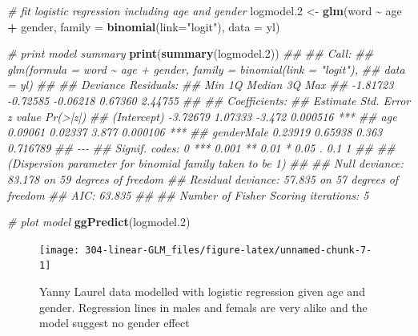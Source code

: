 \documentclass[
]{book}
\newenvironment{Shaded}{\begin{snugshade}}{\end{snugshade}}
\newcommand{\CommentTok}[1]{\textcolor[rgb]{0.56,0.35,0.01}{\textit{#1}}}
\newcommand{\DataTypeTok}[1]{\textcolor[rgb]{0.13,0.29,0.53}{#1}}
\newcommand{\FloatTok}[1]{\textcolor[rgb]{0.00,0.00,0.81}{#1}}
\newcommand{\KeywordTok}[1]{\textcolor[rgb]{0.13,0.29,0.53}{\textbf{#1}}}
\newcommand{\NormalTok}[1]{#1}
\newcommand{\OperatorTok}[1]{\textcolor[rgb]{0.81,0.36,0.00}{\textbf{#1}}}
\newcommand{\StringTok}[1]{\textcolor[rgb]{0.31,0.60,0.02}{#1}}
\theoremstyle{definition}
\theoremstyle{definition}
\theoremstyle{definition}
\theoremstyle{remark}
\begin{document}
\begin{Shaded}
\begin{Highlighting}[]
\CommentTok{\# fit logistic regression including age and gender}
\NormalTok{logmodel}\FloatTok{.2}\NormalTok{ \textless{}{-}}\StringTok{ }\KeywordTok{glm}\NormalTok{(word }\OperatorTok{\textasciitilde{}}\StringTok{ }\NormalTok{age }\OperatorTok{+}\StringTok{ }\NormalTok{gender, }\DataTypeTok{family =} \KeywordTok{binomial}\NormalTok{(}\DataTypeTok{link=}\StringTok{"logit"}\NormalTok{), }\DataTypeTok{data =}\NormalTok{ yl)}

\CommentTok{\# print model summary}
\KeywordTok{print}\NormalTok{(}\KeywordTok{summary}\NormalTok{(logmodel}\FloatTok{.2}\NormalTok{))}
\CommentTok{\#\# }
\CommentTok{\#\# Call:}
\CommentTok{\#\# glm(formula = word \textasciitilde{} age + gender, family = binomial(link = "logit"), }
\CommentTok{\#\#     data = yl)}
\CommentTok{\#\# }
\CommentTok{\#\# Deviance Residuals: }
\CommentTok{\#\#      Min        1Q    Median        3Q       Max  }
\CommentTok{\#\# {-}1.81723  {-}0.72585  {-}0.06218   0.67360   2.44755  }
\CommentTok{\#\# }
\CommentTok{\#\# Coefficients:}
\CommentTok{\#\#             Estimate Std. Error z value Pr(\textgreater{}|z|)    }
\CommentTok{\#\# (Intercept) {-}3.72679    1.07333  {-}3.472 0.000516 ***}
\CommentTok{\#\# age          0.09061    0.02337   3.877 0.000106 ***}
\CommentTok{\#\# genderMale   0.23919    0.65938   0.363 0.716789    }
\CommentTok{\#\# {-}{-}{-}}
\CommentTok{\#\# Signif. codes:  0 \textquotesingle{}***\textquotesingle{} 0.001 \textquotesingle{}**\textquotesingle{} 0.01 \textquotesingle{}*\textquotesingle{} 0.05 \textquotesingle{}.\textquotesingle{} 0.1 \textquotesingle{} \textquotesingle{} 1}
\CommentTok{\#\# }
\CommentTok{\#\# (Dispersion parameter for binomial family taken to be 1)}
\CommentTok{\#\# }
\CommentTok{\#\#     Null deviance: 83.178  on 59  degrees of freedom}
\CommentTok{\#\# Residual deviance: 57.835  on 57  degrees of freedom}
\CommentTok{\#\# AIC: 63.835}
\CommentTok{\#\# }
\CommentTok{\#\# Number of Fisher Scoring iterations: 5}

\CommentTok{\# plot model}
\KeywordTok{ggPredict}\NormalTok{(logmodel}\FloatTok{.2}\NormalTok{)}
\end{Highlighting}
\end{Shaded}

\begin{figure}

{\centering \texttt{[image: 304-linear-GLM\_files/figure-latex/unnamed-chunk-7-1]} 

}

\caption{Yanny Laurel data modelled with logistic regression given age and gender. Regression lines in males and femals are very alike and the model suggest no gender effect}\label{fig:unnamed-chunk-7}
\end{figure}
\end{document}
